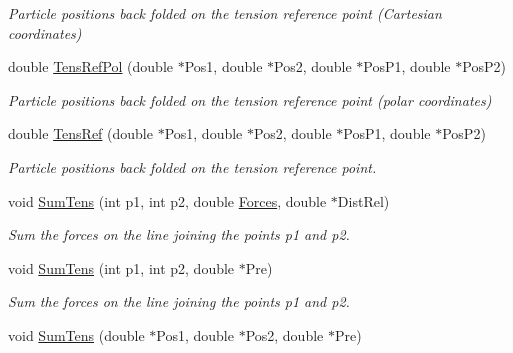 \begin{DoxyCompactItemize}
\begin{DoxyCompactList}\small\item\em \-Particle positions back folded on the tension reference point (\-Cartesian coordinates) \end{DoxyCompactList}\item 
\hypertarget{classForces_a8d63955572a8c5888a8a305fb56ada48}{double \hyperlink{classForces_a8d63955572a8c5888a8a305fb56ada48}{\-Tens\-Ref\-Pol} (double $\ast$\-Pos1, double $\ast$\-Pos2, double $\ast$\-Pos\-P1, double $\ast$\-Pos\-P2)}\label{classForces_a8d63955572a8c5888a8a305fb56ada48}

\begin{DoxyCompactList}\small\item\em \-Particle positions back folded on the tension reference point (polar coordinates) \end{DoxyCompactList}\item 
\hypertarget{classForces_ab49daa22c5de576835d55d185f1a53be}{double \hyperlink{classForces_ab49daa22c5de576835d55d185f1a53be}{\-Tens\-Ref} (double $\ast$\-Pos1, double $\ast$\-Pos2, double $\ast$\-Pos\-P1, double $\ast$\-Pos\-P2)}\label{classForces_ab49daa22c5de576835d55d185f1a53be}

\begin{DoxyCompactList}\small\item\em \-Particle positions back folded on the tension reference point. \end{DoxyCompactList}\item 
\hypertarget{classForces_a1a74ebb3cab127dd10c8d642fb19a537}{void \hyperlink{classForces_a1a74ebb3cab127dd10c8d642fb19a537}{\-Sum\-Tens} (int p1, int p2, double \hyperlink{classForces}{\-Forces}, double $\ast$\-Dist\-Rel)}\label{classForces_a1a74ebb3cab127dd10c8d642fb19a537}

\begin{DoxyCompactList}\small\item\em \-Sum the forces on the line joining the points p1 and p2. \end{DoxyCompactList}\item 
\hypertarget{classForces_a898790f8f00dd994c472c5526c454b77}{void \hyperlink{classForces_a898790f8f00dd994c472c5526c454b77}{\-Sum\-Tens} (int p1, int p2, double $\ast$\-Pre)}\label{classForces_a898790f8f00dd994c472c5526c454b77}

\begin{DoxyCompactList}\small\item\em \-Sum the forces on the line joining the points p1 and p2. \end{DoxyCompactList}\item 
\hypertarget{classForces_aa4ae1e5942505c407b95ebf6d88156eb}{void \hyperlink{classForces_aa4ae1e5942505c407b95ebf6d88156eb}{\-Sum\-Tens} (double $\ast$\-Pos1, double $\ast$\-Pos2, double $\ast$\-Pre)}\label{classForces_aa4ae1e5942505c407b95ebf6d88156eb}


\end{DoxyCompactItemize}
